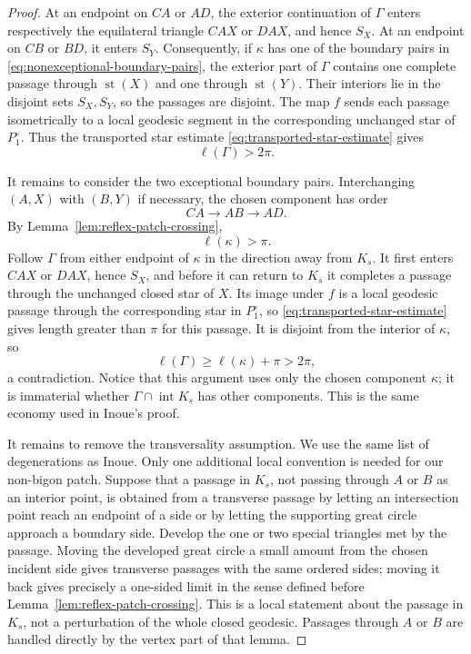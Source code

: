 \documentclass[12pt,a4paper]{article}
\theoremstyle{definition}
\begin{document}
\begin{proof}
At an endpoint on \(CA\) or \(AD\), the exterior continuation of \(\Gamma\)
enters respectively the equilateral triangle \(CAX\) or \(DAX\), and hence
\(S_X\).  At an endpoint on \(CB\) or \(BD\), it enters \(S_Y\).
Consequently, if \(\kappa\) has one of the boundary pairs
in \eqref{eq:nonexceptional-boundary-pairs}, the exterior part of \(\Gamma\)
contains one complete passage through \(\operatorname{st}(X)\) and one
through \(\operatorname{st}(Y)\).  Their interiors lie in the disjoint sets
\(S_X,S_Y\), so the passages are disjoint.  The map \(f\) sends each passage
isometrically to a local geodesic segment in the corresponding unchanged
star of \(P_1^\circ\).  Thus the transported star estimate
\eqref{eq:transported-star-estimate} gives
\[
        \ell(\Gamma)>2\pi.
\]

It remains to consider the two exceptional boundary pairs.  Interchanging
\((A,X)\) with \((B,Y)\) if necessary, the chosen component has order
\begin{equation}\label{eq:same-side-component}
        CA\longrightarrow AB\longrightarrow AD.
\end{equation}
By Lemma~\ref{lem:reflex-patch-crossing},
\[
        \ell(\kappa)>\pi .
\]
Follow \(\Gamma\) from either endpoint of \(\kappa\) in the direction away
from \(K_s\).  It first enters \(CAX\) or \(DAX\), hence \(S_X\), and before
it can return to \(K_s\) it completes a passage through the unchanged closed
star of \(X\).  Its image under \(f\) is a local geodesic passage through the
corresponding star in \(P_1^\circ\), so
\eqref{eq:transported-star-estimate} gives length greater than \(\pi\) for this
passage.
It is disjoint from the interior of \(\kappa\), so
\[
        \ell(\Gamma)\ge \ell(\kappa)+\pi>2\pi,
\]
a contradiction.  Notice that this argument uses only the chosen component
\(\kappa\); it is immaterial whether \(\Gamma\cap\operatorname{int}K_s\) has
other components.  This is the same economy used in Inoue's proof.

It remains to remove the transversality assumption.  We use the same list of
degenerations as Inoue.  Only one additional local convention is needed for
our non-bigon patch.  Suppose that a passage in \(K_s\), not passing through
\(A\) or \(B\) as an interior point, is obtained from a transverse passage by
letting an intersection point reach an endpoint of a side or by letting the
supporting great circle approach a boundary side.  Develop the one or two
special triangles met by the passage.  Moving the developed great circle a
small amount from the chosen incident side gives transverse passages with the
same ordered sides; moving it back gives precisely a one-sided limit in the
sense defined before Lemma~\ref{lem:reflex-patch-crossing}.  This is a local
statement about the passage in \(K_s\), not a perturbation of the whole closed
geodesic.  Passages through \(A\) or \(B\) are handled directly by the vertex
part of that lemma.


\end{proof}
\end{document}
